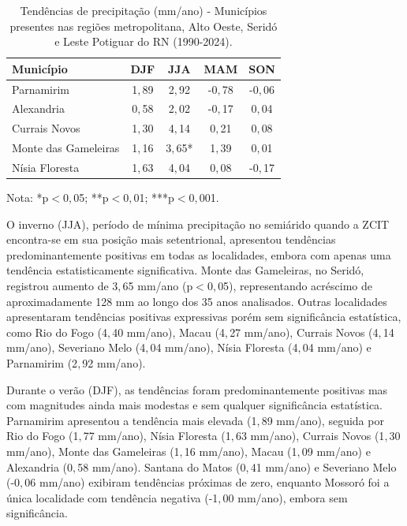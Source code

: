 \begin{table}[H]
	\centering
	\caption{Tendências de precipitação (mm/ano) - Municípios presentes nas regiões metropolitana, Alto Oeste, Seridó e Leste Potiguar do RN (1990-2024).}
	\label{tab:tendencias_prec_rn_b}
	\small
	\begin{tabular}{lcccc}
		\hline
		\textbf{Município} & \textbf{DJF} & \textbf{JJA} & \textbf{MAM} & \textbf{SON} \\
		\hline
		Parnamirim & 1${,}$89 & 2${,}$92 & -0${,}$78& -0${,}$06\\
		Alexandria & 0${,}$58 & 2${,}$02 & -0${,}$17& 0${,}$04 \\
		Currais Novos & 1${,}$30 & 4${,}$14 & 0${,}$21 & 0${,}$08 \\
		Monte das Gameleiras & 1${,}$16 & 3${,}$65*& 1${,}$39 & 0${,}$01 \\
		Nísia Floresta & 1${,}$63 & 4${,}$04 & 0${,}$08 & -0${,}$17\\
		\hline
	\end{tabular}
	\vspace{2mm}
	
	{\footnotesize Nota: *p$<$0${,}$05; **p$<$0${,}$01; ***p$<$0${,}$001.}
\end{table}

O inverno (JJA), período de mínima precipitação no semiárido quando a ZCIT encontra-se em sua posição mais setentrional, apresentou tendências predominantemente positivas em todas as localidades, embora com apenas uma tendência estatisticamente significativa. Monte das Gameleiras, no Seridó, registrou aumento de 3${,}$65 mm/ano (p$<$0${,}$05), representando acréscimo de aproximadamente 128 mm ao longo dos 35 anos analisados. Outras localidades apresentaram tendências positivas expressivas porém sem significância estatística, como Rio do Fogo (4${,}$40 mm/ano), Macau (4${,}$27 mm/ano), Currais Novos (4${,}$14 mm/ano), Severiano Melo (4${,}$04 mm/ano), Nísia Floresta (4${,}$04 mm/ano) e Parnamirim (2${,}$92 mm/ano).

Durante o verão (DJF), as tendências foram predominantemente positivas mas com magnitudes ainda mais modestas e sem qualquer significância estatística. Parnamirim apresentou a tendência mais elevada (1${,}$89 mm/ano), seguida por Rio do Fogo (1${,}$77 mm/ano), Nísia Floresta (1${,}$63 mm/ano), Currais Novos (1${,}$30 mm/ano), Monte das Gameleiras (1${,}$16 mm/ano), Macau (1${,}$09 mm/ano) e Alexandria (0${,}$58 mm/ano). Santana do Matos (0${,}$41 mm/ano) e Severiano Melo (-0${,}$06 mm/ano) exibiram tendências próximas de zero, enquanto Mossoró foi a única localidade com tendência negativa (-1${,}$00 mm/ano), embora sem significância.

